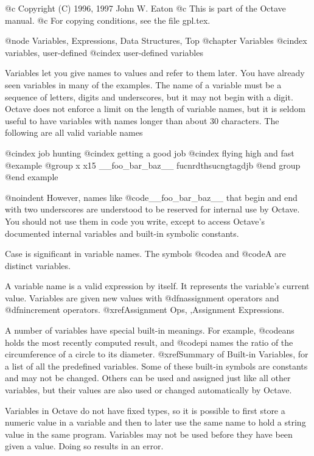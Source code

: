@c Copyright (C) 1996, 1997 John W. Eaton
@c This is part of the Octave manual.
@c For copying conditions, see the file gpl.tex.

@node Variables, Expressions, Data Structures, Top
@chapter Variables
@cindex variables, user-defined
@cindex user-defined variables

Variables let you give names to values and refer to them later.  You have
already seen variables in many of the examples.  The name of a variable
must be a sequence of letters, digits and underscores, but it may not begin
with a digit.  Octave does not enforce a limit on the length of variable
names, but it is seldom useful to have variables with names longer than
about 30 characters.  The following are all valid variable names

@cindex job hunting
@cindex getting a good job
@cindex flying high and fast
@example
@group
x
x15
__foo_bar_baz__
fucnrdthsucngtagdjb
@end group
@end example

@noindent
However, names like @code{__foo_bar_baz__} that begin and end with two
underscores are understood to be reserved for internal use by Octave.
You should not use them in code you write, except to access Octave's
documented internal variables and built-in symbolic constants.

Case is significant in variable names.  The symbols @code{a} and
@code{A} are distinct variables.

A variable name is a valid expression by itself.  It represents the
variable's current value.  Variables are given new values with
@dfn{assignment operators} and @dfn{increment operators}.
@xref{Assignment Ops, ,Assignment Expressions}.

A number of variables have special built-in meanings.  For example,
@code{ans} holds the most recently computed result, and @code{pi} names the
ratio of the circumference of a circle to its diameter. @xref{Summary of
Built-in Variables}, for a list of all the predefined variables.  Some
of these built-in symbols are constants and may not be changed.  Others
can be used and assigned just like all other variables, but their values
are also used or changed automatically by Octave.

Variables in Octave do not have fixed types, so it is possible to first
store a numeric value in a variable and then to later use the same name
to hold a string value in the same program.  Variables may not be used
before they have been given a value.  Doing so results in an error.

